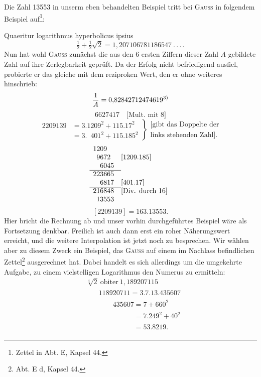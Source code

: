 Die Zahl 13553 in unserm eben behandelten Beispiel tritt bei \textsc{Gauss} in
folgendem Beispiel auf\footnote{Zettel in Abt. E, Kapsel 44.}:
\par\noindent\hspace*{\parindent}Quaeritur logarithmus hyperbolicus ipsius
\[
\tfrac12+\tfrac12\sqrt{2}=1{,}207106781186547\ .\,.\,.\,.
\]
\noindent Nun hat wohl \textsc{Gauss} zunächst die aus den 6 ersten Ziffern dieser Zahl $A$ gebildete Zahl auf ihre Zerlegbarkeit geprüft. Da der Erfolg nicht befriedigend
ausfiel, probierte er das gleiche mit dem reziproken Wert, den er ohne weiteres hinschrieb:
\[
\frac{1}{A}=0{,}82842712474619\text{\textsuperscript{3)}}
\]
\setcounter{footnote}{3}
\[
6627417\quad\text{[Mult. mit 8]}
\]
\[
\left.\begin{aligned}
2209139&=3\mathord{.}1209^2+115\mathord{.}17^2\\
&=3\mathord{.}\phantom{1}401^2+115\mathord{.}185^2
\end{aligned}\right\}
\begin{array}{l}\text{[gibt das Doppelte der}\\\text{links stehenden Zahl].}\end{array}
\]
\[
\begin{array}{r@{\quad}l}
1209\phantom{00}&\\
9672\phantom{0}&[1209\mathord{.}185]\\
6045&\\\cline{1-1}
223665&\\
6817&[401\mathord{.}17]\\\cline{1-1}
216848&\text{[Div. durch 16]}\\
13553&
\end{array}
\]
\[
[2209139]=163\mathord{.}13553.
\]
\clearpage{}
\setcounter{footnote}{0}
\noindent\hspace*{\parindent}Hier bricht die Rechnung ab und unser vorhin durchgeführtes Beispiel
wäre als Fortsetzung denkbar. Freilich ist auch dann erst ein roher Näherungswert erreicht, und die weitere Interpolation ist jetzt noch zu besprechen.
Wir wählen aber zu diesem Zweck ein Beispiel, das \textsc{Gauss} auf einem im
Nachlass befindlichen Zettel\footnote{Abt. E d, Kapsel 44.} ausgerechnet hat. Dabei handelt es sich allerdings um die umgekehrte Aufgabe, zu einem vielstelligen Logarithmus den
Numerus zu ermitteln:
\[
\begin{aligned}
&\sqrt[4]{2}\ \text{obiter}\ 1{,}189207115\\
&\phantom{\sqrt[4]{2}}118920711=3\mathord{.}7\mathord{.}13\mathord{.}435607\\
&\phantom{\sqrt[4]{2}1189}435607=7+660^2\\
&\phantom{\sqrt[4]{2}1189435607}=7\mathord{.}249^2+40^2\\
&\phantom{\sqrt[4]{2}1189435607}=53\mathord{.}8219.
\end{aligned}
\]
